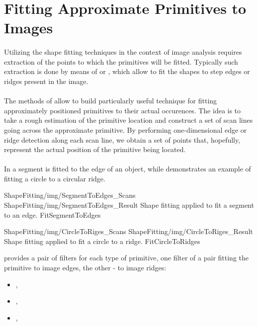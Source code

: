 \section{Fitting Approximate Primitives to Images}

\paragraph*{}
Utilizing the shape fitting techniques in the context of image analysis requires extraction of the points to which the primitives will be fitted. Typically such extraction is done by means of  or , which allow to fit the shapes to step edges or ridges present in the image.

\paragraph*{}
The methods of  allow to build particularly useful technique for fitting approximately positioned primitives to their actual occurences. The idea is to take a rough estimation of the primitive location and construct a set of scan lines going across the approximate primitive. By performing one-dimensional edge or ridge detection along each scan line, we obtain a set of points that, hopefully, represent the actual position of the primitive being located.

\paragraph*{}
In  a segment is fitted to the edge of an object, while  demonstrates an example of fitting a circle to a circular ridge.

\twoFigures
{ShapeFitting/img/SegmentToEdges_Scans}
{ShapeFitting/img/SegmentToEdges_Result}
{Shape fitting applied to fit a segment to an edge.}
{FitSegmentToEdges}
{\basicWidth}

\twoFigures
{ShapeFitting/img/CircleToRiges_Scans}
{ShapeFitting/img/CircleToRiges_Result}
{Shape fitting applied to fit a circle to a ridge.}
{FitCircleToRidges}
{\basicWidth}

\begin{refImpl}
\studio provides a pair of filters for each type of primitive, one filter of a pair fitting the primitive to image edges, the other - to image ridges:
\begin{itemize}
	\item {}, 
	\item {}, 
	\item {}, 
\end{itemize}
\end{refImpl}